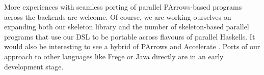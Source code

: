 More experiences with seamless porting of parallel PArrows-based programs across the backends are welcome.
Of course, we are working ourselves on expanding both our skeleton library and the number of skeleton-based parallel programs that use our DSL to be portable across flavours of parallel Haskells.
It would also be interesting to see a hybrid of PArrows and Accelerate \cite{McDonell:2015:TRC:2887747.2804313}.
Ports of our approach to other languages like Frege or Java directly are in an early development stage.
